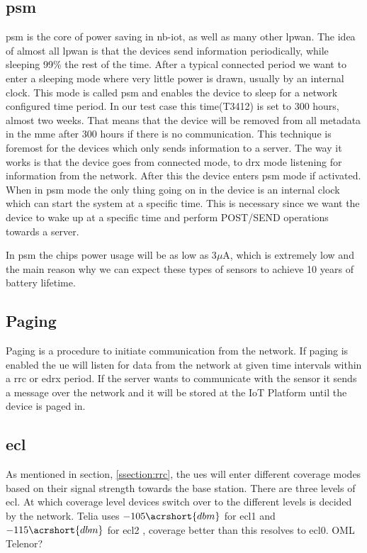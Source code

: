 \documentclass[USenglish]{ifimaster}  %
\begin{document}
\subsection[\acrlong{psm}]{\acrfull{psm}} \label{ssection:psm}
\acrshort{psm} is the core of power saving in \acrshort{nb-iot}, as well as many other \acrshort{lpwan}. The idea of almost all \acrshort{lpwan} is that the devices send information periodically, while sleeping 99\% the rest of the time. After a typical connected period we want to enter a sleeping mode where very little power is drawn, usually by an internal clock. This mode is called \acrshort{psm} and enables the device to sleep for a network configured time period. In our test case this time(\acrfull{T3412}) is set to 300 hours, almost two weeks. That means that the device will be removed from all metadata in the \acrshort{mme} after 300 hours if there is no communication. This technique is foremost for the devices which only sends information to a server. The way it works is that the device goes from connected mode, to \acrshort{drx} mode listening for information from the network. After this the device enters \acrshort{psm} mode if activated. When in \acrshort{psm} mode the only thing going on in the device is an internal clock which can start the system at a specific time. This is necessary since we want the device to wake up at a specific time and perform POST/SEND operations towards a server.

In \acrshort{psm} the chips power usage will be as low as 3$\mu$A, which is extremely low and the main reason why we can expect these types of sensors to achieve 10 years of battery lifetime.

\subsection{Paging} \label{ssection:paging}
Paging is a procedure to initiate communication from the network. If paging is enabled the \acrshort{ue} will listen for data from the network at given time intervals within a \acrshort{rrc} or \acrshort{edrx} period. If the server wants to communicate with the sensor it sends a message over the network and it will be stored at the IoT Platform until the device is paged in.

\subsection{\acrlong{ecl}} \label{ssection:ecl}
As mentioned in section, \vref{ssection:rrc}, the \acrshort{ue}s will enter different coverage modes based on their signal strength towards the base station. There are three levels of \acrfull{ecl}. At which coverage level devices switch over to the different levels is decided by the network. Telia uses ${-105 \acrshort{dbm}}$ for \acrshort{ecl}1 and ${-115 \acrshort{dbm}}$ for \acrshort{ecl}2 \cite{mail:teliaMailThread}, coverage better than this resolves to \acrshort{ecl}0. OML Telenor?
\end{document}
